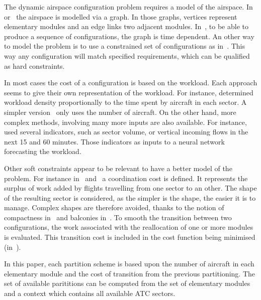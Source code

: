 \documentclass[oneside,twocolumn]{article}
\begin{document}
The dynamic airspace configuration problem requires a model of the airspace.
In~\cite{sergeeva2017dynamic} or~\cite{treimuth2016branch} the airspace
is modelled via a graph. In those graphs, vertices represent elementary modules
and an edge links two adjacent modules. In~\cite{treimuth2016branch}, to be
able to produce a sequence of configurations, the graph is time dependent.
An other way to model the problem is to use a constrained set of
configurations as in~\cite{bloem2010dynamic}.
This way any configuration will match specified requirements, which can be
qualified as hard constraints.

In most cases the cost of a configuration is based on the workload. Each
approach seems to give their own representation of the workload. For instance,
\cite{bedouet2016towards} determined workload density proportionally to the time
spent by aircraft in each sector. A simpler version~\cite{sergeeva2017dynamic}
only uses the number of aircraft. On the other hand, more complex methods,
involving many more inputs are also available. For
instance,~\cite{gianazza2010forecasting} used several indicators, such as sector
volume, or vertical incoming flows in the next 15 and 60 minutes. Those
indicators as inputs to a neural network forecasting the workload.

Other soft constraints appear to be relevant to have a better model of
the problem. For instance in~\cite{sergeeva2017dynamic}
and~\cite{bedouet2016towards} a
coordination cost is defined. It represents the surplus of work added by
flights travelling from one sector to an other. The shape of the
resulting sector is considered, as the simpler is
the shape, the easier it is to manage. Complex shapes are therefore avoided,
thanks to the notion of compactness in~\cite{jagare2013airspace} and balconies
in~\cite{sergeeva2017dynamic}. To smooth the transition between two
configurations, the work associated with the reallocation of one or more modules
is evaluated. This transition cost is included in the cost function being
minimised (in~\cite{bedouet2016towards}).

In this paper, each partition scheme is based upon the number of aircraft in
each
elementary module and the cost of transition from the previous partitioning.
The set of available parititions can be computed from the set of elementary
modules and a context which contains all available ATC sectors.
\end{document}
